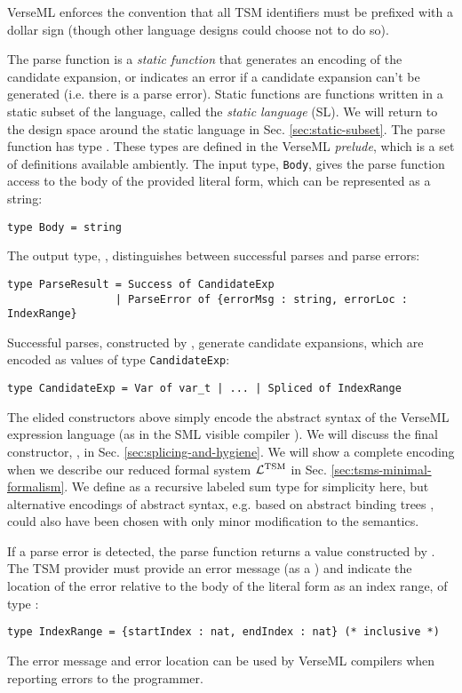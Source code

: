 VerseML enforces the convention that all TSM identifiers must be prefixed with a dollar sign (though other language designs could choose not to do so). 

The {parse function} is a \emph{static function} that generates an encoding of the candidate expansion, or indicates an error if a candidate expansion can't be generated (i.e. there is a parse error).  Static functions are functions written in a static subset of the language, called the \emph{static language} (SL). We will return to the design space around the static language in Sec. \ref{sec:static-subset}. The parse function has type . These types are defined in the VerseML \emph{prelude}, which is a set of definitions available ambiently. The input type, \lstinline{Body}, gives the parse function access to the {body} of the provided literal form, which can be represented as a string:
\begin{lstlisting}[numbers=none]
type Body = string
\end{lstlisting} 

The output type, , distinguishes between successful parses and parse errors:
\begin{lstlisting}[numbers=none]
type ParseResult = Success of CandidateExp 
                 | ParseError of {errorMsg : string, errorLoc : IndexRange}
\end{lstlisting}

Successful parses, constructed by , generate candidate expansions, which are encoded as values of type \lstinline{CandidateExp}:
\begin{lstlisting}[numbers=none]
type CandidateExp = Var of var_t | ... | Spliced of IndexRange
\end{lstlisting}
The elided constructors above simply encode the abstract syntax of the VerseML expression language (as in the SML visible compiler \cite{SML/VisibleCompiler}). We will discuss the final constructor, , in Sec. \ref{sec:splicing-and-hygiene}. We will show a complete encoding when we describe our reduced formal system $\mathcal{L}^\text{TSM}$ in Sec. \ref{sec:tsms-minimal-formalism}. We define  as  a recursive labeled sum type for simplicity here, but alternative encodings of abstract syntax, e.g. based on abstract binding trees \cite{pfpl}, could also have been chosen with only minor modification to the semantics. %

If a parse error is detected, the parse function returns a value constructed by . The TSM provider must provide an error message (as a ) and indicate the location of the error relative to the body of the literal form as an index range, of type :
\begin{lstlisting}[numbers=none]
type IndexRange = {startIndex : nat, endIndex : nat} (* inclusive *)
\end{lstlisting}
The error message and error location can be used by VerseML compilers when reporting errors to the programmer.

